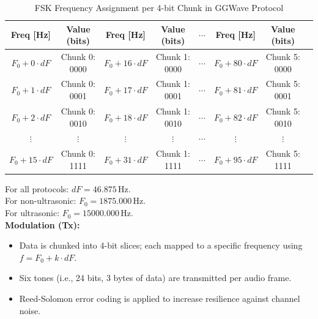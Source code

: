 \documentclass[12pt,openany]{article}
\theoremstyle{definition}
\theoremstyle{definition}
\theoremstyle{definition}
\begin{document}
\begin{table}[h]
\begin{adjustwidth}{-5cm}{-5cm}
\centering
\caption{FSK Frequency Assignment per 4-bit Chunk in GGWave Protocol}
\begin{tabular}{|c|c|c|c|c|c|c|c|}
\hline
\textbf{Freq [Hz]}       & \textbf{Value (bits)}   & \textbf{Freq [Hz]}       & \textbf{Value (bits)}    & $\cdots$ & \textbf{Freq [Hz]}    & \textbf{Value (bits)}  \\
\hline
$F_0 + 0 \cdot dF$       & Chunk 0: 0000           & $F_0 + 16 \cdot dF$      & Chunk 1: 0000            & $\cdots$ & $F_0 + 80 \cdot dF$   & Chunk 5: 0000          \\
$F_0 + 1 \cdot dF$       & Chunk 0: 0001           & $F_0 + 17 \cdot dF$      & Chunk 1: 0001            & $\cdots$ & $F_0 + 81 \cdot dF$   & Chunk 5: 0001          \\
$F_0 + 2 \cdot dF$       & Chunk 0: 0010           & $F_0 + 18 \cdot dF$      & Chunk 1: 0010            & $\cdots$ & $F_0 + 82 \cdot dF$   & Chunk 5: 0010          \\
$\vdots$                 & $\vdots$                & $\vdots$                 & $\vdots$                 & $\cdots$ & $\vdots$              & $\vdots$               \\
$F_0 + 15 \cdot dF$      & Chunk 0: 1111           & $F_0 + 31 \cdot dF$      & Chunk 1: 1111            & $\cdots$ & $F_0 + 95 \cdot dF$   & Chunk 5: 1111          \\
\hline
\end{tabular}
\end{adjustwidth}
\end{table}

\vspace{0.5em}
\raggedright
\footnotesize
For all protocols: $dF = 46.875$\,Hz. \\
For non-ultrasonic: $F_0 = 1875.000$\,Hz.\\ 
For ultrasonic: $F_0 = 15000.000$\,Hz.\\
\clearpage
\justifying
\normalsize
\noindent
\textbf{Modulation (Tx):}
\begin{itemize}
    \item Data is chunked into 4-bit slices; each mapped to a specific frequency using $f = F_0 + k\cdot dF$.
    \item Six tones (i.e., 24 bits, 3 bytes of data) are transmitted per audio frame.
    \item Reed-Solomon error coding is applied to increase resilience against channel noise.
\end{itemize}
\end{document}
